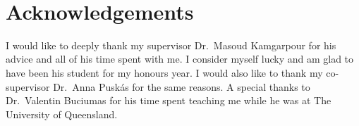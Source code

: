 \documentclass[11pt]{amsart}
\theoremstyle{remark}
\begin{document}
\
\newpage

\section*{Acknowledgements}
I would like to deeply thank my supervisor Dr.\ Masoud Kamgarpour for his advice and all of his time spent with me. I consider myself lucky and am glad to have been his student for my honours year. I would also like to thank my co-supervisor Dr.\ Anna Puskás for the same reasons. A special thanks to Dr.\ Valentin Buciumas for his time spent teaching me while he was at The University of Queensland.
\newpage

\
\newpage



\newpage


\newpage


\newpage


\end{document}
